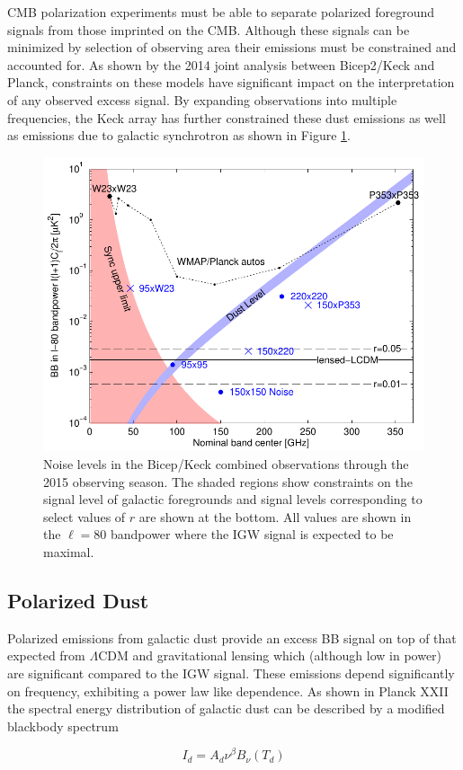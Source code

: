 \documentclass[12pt]{article}
\begin{document}
CMB polarization experiments must be able to separate polarized foreground
signals from those imprinted on the CMB. Although these signals can be
minimized by selection of observing area their emissions must be constrained
and accounted for. As shown by the 2014 joint analysis between Bicep2/Keck and
Planck, constraints on these models have significant impact on the
interpretation of any observed excess signal. By expanding observations into
multiple frequencies, the Keck array has further constrained these dust
emissions as well as emissions due to galactic synchrotron as shown in Figure
\ref{fig:noilev}.
\begin{figure}
	\center
	\includegraphics[width=.7\textwidth]{noilev_bk15.pdf}
	\caption{Noise levels in the Bicep/Keck combined observations through the
	2015 observing season. The shaded regions show constraints on the signal
	level of galactic foregrounds and signal levels corresponding to select values
	of $r$ are shown at the bottom. All values are shown in the $\ell=80$
	bandpower where the IGW signal is expected to be maximal.}
	\label{fig:noilev}
\end{figure}

\subsection{Polarized Dust}
Polarized emissions from galactic dust provide an excess BB signal on top of
that expected from $\Lambda$CDM and gravitational lensing which (although low
in power) are significant compared to the IGW signal. These emissions depend
significantly on frequency, exhibiting a power law like dependence. As shown
in Planck XXII \cite{cite:PlanckXXII} the spectral energy distribution of
galactic dust can be described by a modified blackbody spectrum

\begin{equation}
	I_d=A_d\nu ^\beta B_{\nu}(T_d)
	\label{eq:dust_sed}
\end{equation}
\end{document}
